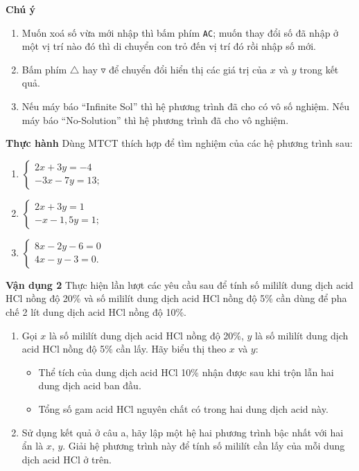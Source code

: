 \begin{lesson}

    \textbf{Chú ý}
    \begin{enumerate}
        \item Muốn xoá số vừa mới nhập thì bấm phím \texttt{AC}; muốn thay đổi số đã nhập ở một vị trí nào đó thì di chuyển con trỏ đến vị trí đó rồi nhập số mới.
        \item Bấm phím $\triangle$ hay $\triangledown$ để chuyển đổi hiển thị các giá trị của $x$ và $y$ trong kết quả.
        \item Nếu máy báo “Infinite Sol” thì hệ phương trình đã cho có vô số nghiệm. Nếu máy báo “No-Solution” thì hệ phương trình đã cho vô nghiệm.
    \end{enumerate}

    \textbf{Thực hành} Dùng MTCT thích hợp để tìm nghiệm của các hệ phương trình sau:
    \begin{enumerate}[label=\alph*)]
        \item $\begin{cases}2x+3y=-4\\-3x-7y=13;\end{cases}$
        \item $\begin{cases}2x+3y=1\\-x-1{,}5y=1;\end{cases}$
        \item $\begin{cases}8x-2y-6=0\\4x-y-3=0.\end{cases}$
    \end{enumerate}

    \answerline
    \answerline
    \answerline

    \textbf{Vận dụng 2} Thực hiện lần lượt các yêu cầu sau để tính số mililít dung dịch acid HCl nồng độ 20\% và số mililít dung dịch acid HCl nồng độ 5\% cần dùng để pha chế 2 lít dung dịch acid HCl nồng độ 10\%.
    \begin{enumerate}[label=\alph*)]
        \item Gọi $x$ là số mililít dung dịch acid HCl nồng độ 20\%, $y$ là số mililít dung dịch acid HCl nồng độ 5\% cần lấy. Hãy biểu thị theo $x$ và $y$:
        \begin{itemize}
            \item Thể tích của dung dịch acid HCl 10\% nhận được sau khi trộn lẫn hai dung dịch acid ban đầu.
            \item Tổng số gam acid HCl nguyên chất có trong hai dung dịch acid này.
        \end{itemize}
        \item Sử dụng kết quả ở câu a, hãy lập một hệ hai phương trình bậc nhất với hai ẩn là $x$, $y$. Giải hệ phương trình này để tính số mililít cần lấy của mỗi dung dịch acid HCl ở trên.
    \end{enumerate}


\end{lesson}
